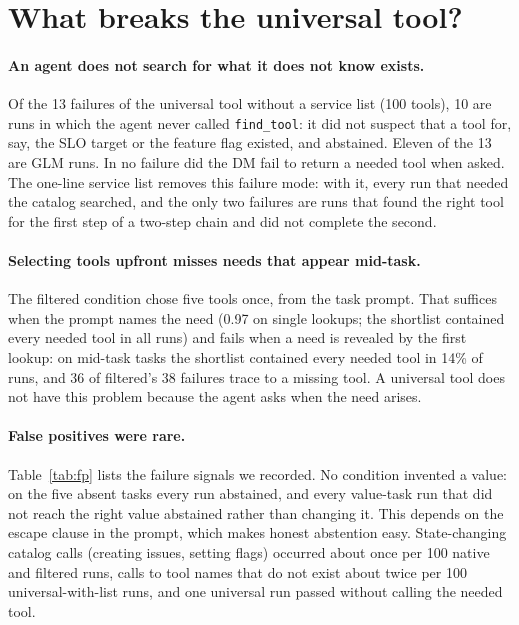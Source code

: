 \section{What breaks the universal tool?}\label{sec:breaks}

\paragraph{An agent does not search for what it does not know exists.} Of the 13 failures of the universal tool
without a service list (100 tools), 10 are runs in which the agent never called \texttt{find\_tool}: it did not
suspect that a tool for, say, the SLO target or the feature flag existed, and abstained. Eleven of the 13 are
GLM runs. In no failure did the DM fail to return a needed tool when asked. The one-line service list removes
this failure mode: with it, every run that needed the catalog searched, and the only two failures are runs that
found the right tool for the first step of a two-step chain and did not complete the second.

\paragraph{Selecting tools upfront misses needs that appear mid-task.} The filtered condition chose five tools
once, from the task prompt. That suffices when the prompt names the need (0.97 on single lookups; the shortlist
contained every needed tool in all runs) and fails when a need is revealed by the first lookup: on mid-task
tasks the shortlist contained every needed tool in 14\% of runs, and 36 of filtered's 38 failures trace to a
missing tool. A universal tool does not have this problem because the agent asks when the need arises.

\paragraph{False positives were rare.} Table~\ref{tab:fp} lists the failure signals we recorded. No condition
invented a value: on the five absent tasks every run abstained, and every value-task run that did not reach the
right value abstained rather than changing it. This depends on the escape clause in the prompt, which makes honest abstention
easy. State-changing catalog calls (creating issues, setting flags) occurred about once per 100 native and
filtered runs, calls to tool names that do not exist about twice per 100 universal-with-list runs, and one universal run passed
without calling the needed tool.

